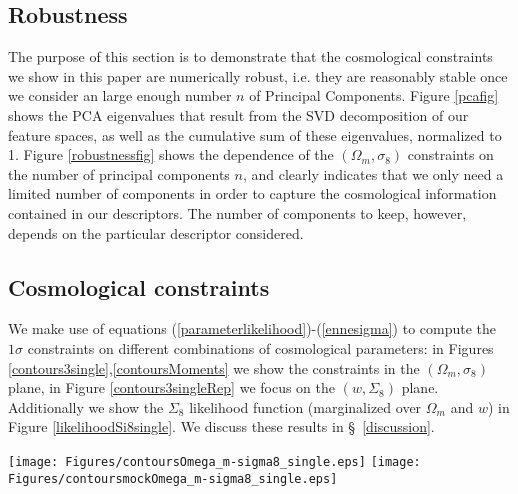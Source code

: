 \documentclass[reprint,aps,prd,superscriptaddress,showkeys,showpacs]{revtex4-1}
\begin{document}

\subsection{Robustness}
%
The purpose of this section is to demonstrate that the cosmological constraints we show in this paper are numerically robust, i.e. they are reasonably stable once we consider an large enough number $n$ of Principal Components. Figure \ref{pcafig} shows the PCA eigenvalues that result from the SVD decomposition of our feature spaces, as well as the cumulative sum of these eigenvalues, normalized to 1. Figure \ref{robustnessfig} shows the dependence of the $(\Omega_m,\sigma_8)$ constraints on the number of principal components $n$, and clearly indicates that we only need a limited number of components in order to capture the cosmological information contained in our descriptors. The number of components to keep, however, depends on the particular descriptor considered. 


\subsection{Cosmological constraints}
%
We make use of equations (\ref{parameterlikelihood})-(\ref{ennesigma}) to compute the $1\sigma$ constraints on different combinations of cosmological parameters: in Figures \ref{contours3single},\ref{contoursMoments} we show the constraints in the $(\Omega_m,\sigma_8)$ plane, in Figure \ref{contours3singleRep} we focus on the $(w,\Sigma_8)$ plane. Additionally we show the $\Sigma_8$ likelihood function (marginalized over $\Omega_m$ and $w$) in Figure \ref{likelihoodSi8single}. We discuss these results in \S~\ref{discussion}. 

\begin{figure*}
\begin{center}
\texttt{[image: Figures/contoursOmega\_m-sigma8\_single.eps]}
\texttt{[image: Figures/contoursmockOmega\_m-sigma8\_single.eps]}
\end{center}
\caption{$1\sigma$ constraints on the $(\Omega_m,\sigma_8)$ parameter doublet using the Power Spectrum (red), $V_0$ (blue), $V_1$ (green), $V_2$ (black) and Moments (orange) statistics; we show the constraints from the data (left panel) and from a mock observation constructed using the mean of 1000 realizations in CFHTcov simulations as data (right panel). The contours are calculated from the parameter likelihood function $\mathcal{L}$ marginalized over $w$. The parentheses near the descriptor label refer to the number of principal components.}
\label{contours3single}
\end{figure*}
\end{document}
